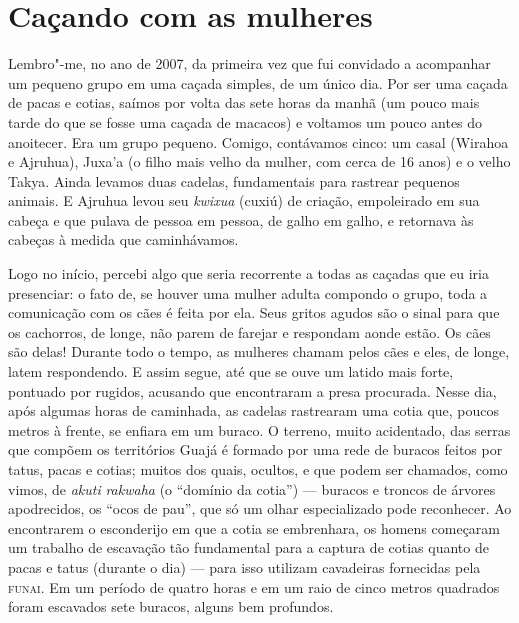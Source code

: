 \section{Caçando com as mulheres}

Lembro"-me, no ano de 2007, da primeira vez que fui convidado a
acompanhar um pequeno grupo em uma caçada simples, de um único dia. Por
ser uma caçada de pacas e cotias, saímos por volta das sete horas da
manhã (um pouco mais tarde do que se fosse uma caçada de macacos) e
voltamos um pouco antes do anoitecer. Era um grupo pequeno. Comigo,
contávamos cinco: um casal (Wirahoa e Ajruhua), Juxa'a (o filho mais
velho da mulher, com cerca de 16 anos) e o velho Takya. Ainda levamos
duas cadelas, fundamentais para rastrear pequenos animais. E Ajruhua
levou seu \emph{kwixua} (cuxiú) de criação, empoleirado em sua cabeça e
que pulava de pessoa em pessoa, de galho em galho, e retornava às
cabeças à medida que caminhávamos.

Logo no início, percebi algo que seria recorrente a todas as caçadas que
eu iria presenciar: o fato de, se houver uma mulher adulta compondo o
grupo, toda a comunicação com os cães é feita por ela. Seus gritos
agudos são o sinal para que os cachorros, de longe, não parem de farejar
e respondam aonde estão. Os cães são delas! Durante todo o tempo, as
mulheres chamam pelos cães e eles, de longe, latem respondendo. E assim
segue, até que se ouve um latido mais forte, pontuado por rugidos,
acusando que encontraram a presa procurada. Nesse dia, após algumas
horas de caminhada, as cadelas rastrearam uma cotia que, poucos metros à
frente, se enfiara em um buraco. O terreno, muito acidentado, das serras
que compõem os territórios Guajá é formado por uma rede de buracos
feitos por tatus, pacas e cotias; muitos dos quais, ocultos, e que podem
ser chamados, como vimos, de \emph{akuti} \emph{rakwaha} (o ``domínio da
cotia'') --- buracos e troncos de árvores apodrecidos, os ``ocos de pau'',
que só um olhar especializado pode reconhecer. Ao encontrarem o
esconderijo em que a cotia se embrenhara, os homens começaram um
trabalho de escavação tão fundamental para a captura de cotias quanto de
pacas e tatus (durante o dia) --- para isso utilizam cavadeiras fornecidas
pela \textsc{funai}. Em um período de quatro horas e em um raio de cinco metros
quadrados foram escavados sete buracos, alguns bem profundos.

